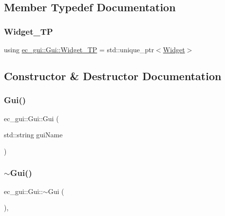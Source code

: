\subsection{Member Typedef Documentation}
\mbox{\label{classec__gui_1_1_gui_af2df87aa1795fe5b141e1137084f7822}} 
\subsubsection{\texorpdfstring{Widget\+\_\+\+TP}{Widget\_TP}}
{\footnotesize\ttfamily using \mbox{\hyperlink{classec__gui_1_1_gui_af2df87aa1795fe5b141e1137084f7822}{ec\+\_\+gui\+::\+Gui\+::\+Widget\+\_\+\+TP}} =  std\+::unique\+\_\+ptr$<$\mbox{\hyperlink{classec__gui_1_1_widget}{Widget}}$>$}



\subsection{Constructor \& Destructor Documentation}
\mbox{\label{classec__gui_1_1_gui_a3db88342b9e6979451a50d96e769b10d}} 
\subsubsection{\texorpdfstring{Gui()}{Gui()}}
{\footnotesize\ttfamily ec\+\_\+gui\+::\+Gui\+::\+Gui (\begin{DoxyParamCaption}\item[{std\+::string}]{gui\+Name }\end{DoxyParamCaption})\hspace{0.3cm}{\ttfamily [explicit]}}

\mbox{\label{classec__gui_1_1_gui_a77aa635b86319deb6318c1255ffddc7d}} 
\subsubsection{\texorpdfstring{$\sim$\+Gui()}{~Gui()}}
{\footnotesize\ttfamily ec\+\_\+gui\+::\+Gui\+::$\sim$\+Gui (\begin{DoxyParamCaption}{ }\end{DoxyParamCaption})\hspace{0.3cm}{\ttfamily [virtual]}, {\ttfamily [default]}}



